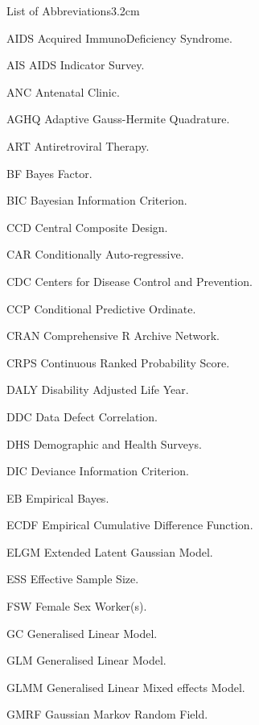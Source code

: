 

\begin{mclistof}{List of Abbreviations}{3.2cm}

\item[AIDS] Acquired ImmunoDeficiency Syndrome.
\item[AIS] AIDS Indicator Survey.
\item[ANC] Antenatal Clinic.
\item[AGHQ] Adaptive Gauss-Hermite Quadrature.
\item[ART] Antiretroviral Therapy.
\item[BF] Bayes Factor.
\item[BIC] Bayesian Information Criterion.
\item[CCD] Central Composite Design.
\item[CAR] Conditionally Auto-regressive.
\item[CDC] Centers for Disease Control and Prevention.
\item[CCP] Conditional Predictive Ordinate.
\item[CRAN] Comprehensive R Archive Network.
\item[CRPS] Continuous Ranked Probability Score.
\item[DALY] Disability Adjusted Life Year.
\item[DDC] Data Defect Correlation.
\item[DHS] Demographic and Health Surveys.
\item[DIC] Deviance Information Criterion.
\item[EB] Empirical Bayes.
\item[ECDF] Empirical Cumulative Difference Function.
\item[ELGM] Extended Latent Gaussian Model.
\item[ESS] Effective Sample Size.
\item[FSW] Female Sex Worker(s).
\item[GC] Generalised Linear Model.
\item[GLM] Generalised Linear Model.
\item[GLMM] Generalised Linear Mixed effects Model.
\item[GMRF] Gaussian Markov Random Field.

\end{mclistof}

